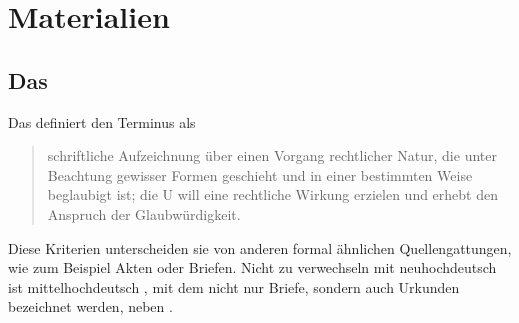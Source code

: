 \chapter{Materialien}
\label{ch:materialien}

\section{Das }
\label{sec:materialcao}

Das  definiert den Terminus
 als \blockcquote[574]{frenz1998a}{schriftliche
Aufzeichnung über einen Vorgang rechtlicher Natur, die unter Beachtung gewisser
Formen geschieht und in einer bestimmten Weise beglaubigt ist; die
U will eine rechtliche Wirkung erzielen und erhebt den Anspruch
der Glaubwürdigkeit.}

Diese Kriterien unterscheiden sie von anderen formal ähnlichen
Quellengattungen, wie zum Beispiel Akten oder Briefen. Nicht zu verwechseln mit
neuhochdeutsch  ist mittelhochdeutsch
, mit dem nicht nur Briefe, sondern auch Urkunden
bezeichnet werden, neben 
\autocites[][s.\,v.~]{mwb1}[][s.\,v.~]{mwb2}[vgl.
auch][]{schmidtwiegand1998a}.

